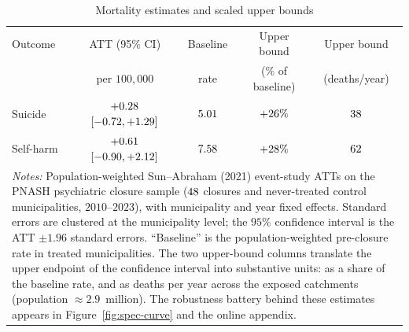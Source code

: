 \begin{table}[!htbp]\centering
\caption{Mortality estimates and scaled upper bounds}
\label{tab:main-mortality-scaled-bounds}
\small
\begin{tabular}{lcccc}
\toprule
Outcome & ATT (95\% CI) & Baseline & Upper bound & Upper bound \\
 & per $100{,}000$ & rate & (\% of baseline) & (deaths/year) \\
\midrule
Suicide   & $+0.28$ $[-0.72, +1.29]$ & $5.01$ & $+26\%$ & $38$ \\
Self-harm & $+0.61$ $[-0.90, +2.12]$ & $7.58$ & $+28\%$ & $62$ \\
\bottomrule
\multicolumn{5}{p{0.92\textwidth}}{\footnotesize \emph{Notes:} Population-weighted Sun--Abraham (2021) event-study ATTs on the PNASH psychiatric closure sample ($48$ closures and never-treated control municipalities, $2010$--$2023$), with municipality and year fixed effects. Standard errors are clustered at the municipality level; the $95\%$ confidence interval is the ATT $\pm 1.96$ standard errors. ``Baseline'' is the population-weighted pre-closure rate in treated municipalities. The two upper-bound columns translate the upper endpoint of the confidence interval into substantive units: as a share of the baseline rate, and as deaths per year across the exposed catchments (population $\approx 2.9$~million). The robustness battery behind these estimates appears in Figure~\ref{fig:spec-curve} and the online appendix.}\\
\end{tabular}
\end{table}
